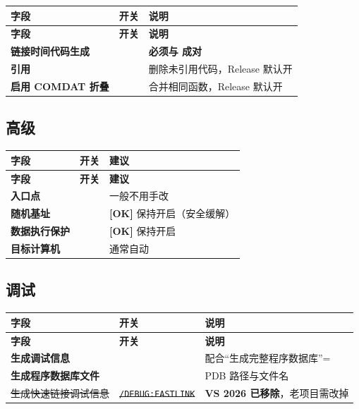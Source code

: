 {{\begin{longtable}{L{4.6cm}L{2.8cm}L{7.0cm}}
\toprule
\textbf{字段} & \textbf{开关} & \textbf{说明} \\
\midrule
\endfirsthead
\toprule
\textbf{字段} & \textbf{开关} & \textbf{说明} \\
\midrule
\endhead
\bottomrule
\endlastfoot
\textbf{链接时间代码生成} &  & \textbf{必须与  成对} \\
\textbf{引用} &  & 删除未引用代码，Release 默认开 \\
\textbf{启用 COMDAT 折叠} &  & 合并相同函数，Release 默认开 \\
\end{longtable}

\subsection{高级}

\begin{longtable}{L{3.4cm}L{3.6cm}L{7.4cm}}
\toprule
\textbf{字段} & \textbf{开关} & \textbf{建议} \\
\midrule
\endfirsthead
\toprule
\textbf{字段} & \textbf{开关} & \textbf{建议} \\
\midrule
\endhead
\bottomrule
\endlastfoot
\textbf{入口点} &  & 一般不用手改 \\
\textbf{随机基址} &  & \textbf{[OK]} 保持开启（安全缓解） \\
\textbf{数据执行保护} &  & \textbf{[OK]} 保持开启 \\
\textbf{目标计算机} &  & 通常自动 \\
\end{longtable}

\subsection{调试}

\begin{longtable}{L{4.0cm}L{4.2cm}L{6.2cm}}
\toprule
\textbf{字段} & \textbf{开关} & \textbf{说明} \\
\midrule
\endfirsthead
\toprule
\textbf{字段} & \textbf{开关} & \textbf{说明} \\
\midrule
\endhead
\bottomrule
\endlastfoot
\textbf{生成调试信息} &  & 配合“生成完整程序数据库”=  \\
\textbf{生成程序数据库文件} &  & PDB 路径与文件名 \\
\sout{生成快速链接调试信息} & \sout{\texttt{/DEBUG:FASTLINK}} & \textbf{VS 2026 已移除}，老项目需改掉 \\
\end{longtable}

}}
